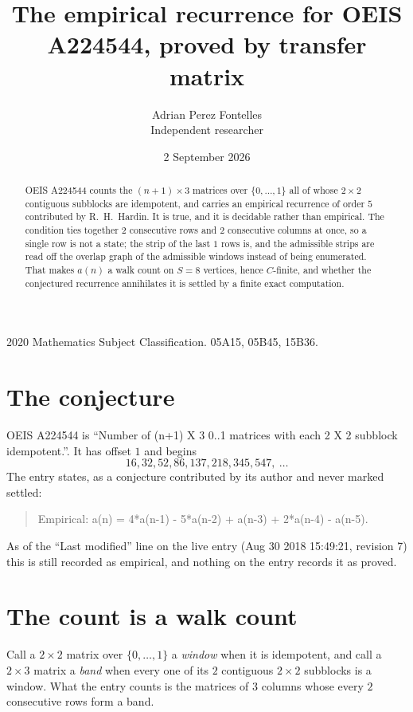 \documentclass[11pt,a4paper]{article}
\title{The empirical recurrence for OEIS A224544, proved by transfer matrix}
\author{Adrian Perez Fontelles\\ \small Independent researcher}
\date{2 September 2026}
\theoremstyle{plain}
\theoremstyle{definition}
\begin{document}
\maketitle

\begin{abstract}
OEIS A224544 counts the $(n+1)\times3$ matrices over $\{0,\dots,1\}$ all of whose
$2\times2$ contiguous subblocks are idempotent, and carries an empirical recurrence of order
$5$ contributed by R.~H.~Hardin. It is true, and it is decidable rather than empirical.
The condition ties together $2$ consecutive rows and $2$ consecutive columns at once, so a
single row is not a state; the strip of the last $1$ rows is, and the admissible strips
are read off the overlap graph of the admissible windows instead of being enumerated. That
makes $a(n)$ a walk count on $S=8$ vertices, hence $C$-finite, and whether the conjectured
recurrence annihilates it is settled by a finite exact computation.
\end{abstract}

\noindent\small 2020 Mathematics Subject Classification. 05A15, 05B45, 15B36.\normalsize

\section{The conjecture}

OEIS A224544 is ``Number of (n+1) X 3 0..1 matrices with each 2 X 2 subblock idempotent.''. It has offset $1$ and begins
\[
16, 32, 52, 86, 137, 218, 345, 547,\ \dots
\]
The entry states, as a conjecture contributed by its author and never marked settled:
\begin{quote}
Empirical: a(n) = 4*a(n-1) - 5*a(n-2) + a(n-3) + 2*a(n-4) - a(n-5).
\end{quote}
As of the ``Last modified'' line on the live entry (Aug 30 2018 15:49:21, revision 7) this is still
recorded as empirical, and nothing on the entry records it as proved.

\section{The count is a walk count}

Call a $2\times2$ matrix over $\{0,\dots,1\}$ a \emph{window} when it is idempotent, and
call a $2\times3$ matrix a \emph{band} when every one of its $2$ contiguous
$2\times2$ subblocks is a window. What the entry counts is the matrices of $3$ columns
whose every $2$ consecutive rows form a band.
\end{document}
